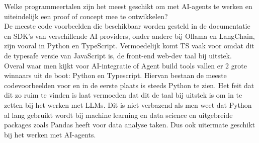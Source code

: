 Welke programmeertalen zijn het meest geschikt om met AI-agents te werken en uiteindelijk een proof of concept mee te ontwikkelen? \\

De meeste code voorbeelden die beschikbaar worden gesteld in de documentatie en SDK's van verschillende AI-providers, onder andere bij Ollama en LangChain, zijn vooral in Python en TypeScript. Vermoedelijk komt TS vaak voor omdat dit de typesafe versie van JavaScript is, de front-end web-dev taal bij uitstek. \\

Overal waar men kijkt voor AI-integratie of Agent build tools vallen er 2 grote winnaars uit de boot: Python en Typescript. Hiervan bestaan de meeste codevoorbeelden voor en in de eerste plaats is steeds Python te zien. Het feit dat dit zo ruim te vinden is laat vermoeden dat dit de taal bij uitstek is om in te zetten bij het werken met LLMs. Dit is niet verbazend als men weet dat Python al lang gebruikt wordt bij machine learning en data science en uitgebreide packages zoals Pandas heeft voor data analyse taken. Dus ook uitermate geschikt bij het werken met AI-agents.